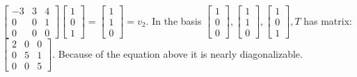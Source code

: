 \documentclass{article}
\begin{document}
$\begin{bmatrix}
    -3&3&4\\0&0&1\\0&0&0
\end{bmatrix}\begin{bmatrix}
    1\\0\\1
\end{bmatrix} = \begin{bmatrix}
    1\\1\\0
\end{bmatrix} = v_2$. In the basis $\begin{bmatrix}
    1\\0\\0
\end{bmatrix}, \begin{bmatrix}
    1\\1\\0
\end{bmatrix}, \begin{bmatrix}
    1\\0\\1
\end{bmatrix}, T$ has matrix: $\begin{bmatrix}
    2&0&0\\0&5&1\\0&0&5
\end{bmatrix}$. Because of the equation above it is nearly diagonalizable. 
    
\end{document}
